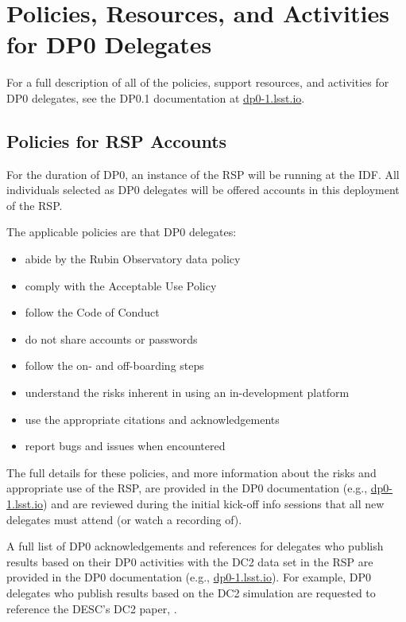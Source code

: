 \documentclass[DM,lsstdraft,authoryear,toc]{lsstdoc}
\begin{document}
\section{Policies, Resources, and Activities for DP0 Delegates}\label{sec:res}

For a full description of all of the policies, support resources, and activities for DP0 delegates, see the DP0.1 documentation at \url{dp0-1.lsst.io}.


\subsection{Policies for RSP Accounts}\label{ssec:res_pol}

For the duration of DP0, an instance of the RSP will be running at the IDF.
All individuals selected as DP0 delegates will be offered accounts in this deployment of the RSP.

The applicable policies are that DP0 delegates:
\begin{itemize}
\item abide by the Rubin Observatory data policy 
\item comply with the Acceptable Use Policy
\item follow the Code of Conduct
\item do not share accounts or passwords
\item follow the on- and off-boarding steps
\item understand the risks inherent in using an in-development platform
\item use the appropriate citations and acknowledgements
\item report bugs and issues when encountered
\end{itemize}

The full details for these policies, and more information about the risks and appropriate use of the RSP, are provided in the DP0 documentation (e.g., \url{dp0-1.lsst.io}) and are reviewed during the initial kick-off info sessions that all new delegates must attend (or watch a recording of).

A full list of DP0 acknowledgements and references for delegates who publish results based on their DP0 activities with the DC2 data set in the RSP are provided in the DP0 documentation (e.g., \url{dp0-1.lsst.io}). 
For example, DP0 delegates who publish results based on the DC2 simulation are requested to reference the DESC's DC2 paper, \citet{2020arXiv201005926L}.
\end{document}

